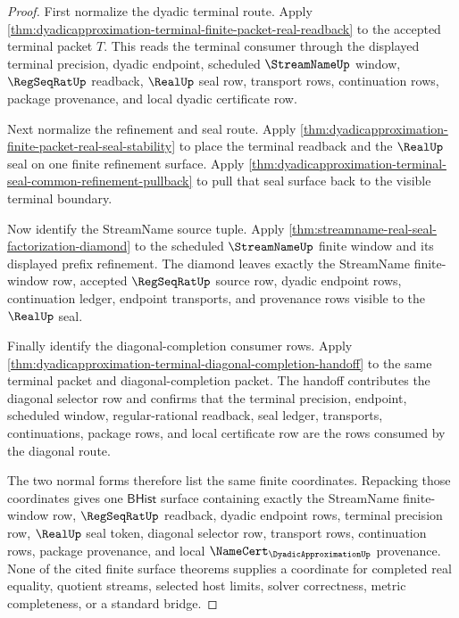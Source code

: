 \begin{proof}
First normalize the dyadic terminal route. Apply
\autoref{thm:dyadicapproximation-terminal-finite-packet-real-readback} to the
accepted terminal packet $T$. This reads the terminal consumer through the
displayed terminal precision, dyadic endpoint, scheduled $\StreamNameUp$
window, $\RegSeqRatUp$ readback, $\RealUp$ seal row, transport rows,
continuation rows, package provenance, and local dyadic certificate row.

Next normalize the refinement and seal route. Apply
\autoref{thm:dyadicapproximation-finite-packet-real-seal-stability} to place
the terminal readback and the $\RealUp$ seal on one finite refinement surface.
Apply
\autoref{thm:dyadicapproximation-terminal-seal-common-refinement-pullback} to
pull that seal surface back to the visible terminal boundary.

Now identify the StreamName source tuple. Apply
\autoref{thm:streamname-real-seal-factorization-diamond} to the scheduled
$\StreamNameUp$ finite window and its displayed prefix refinement. The
diamond leaves exactly the StreamName finite-window row, accepted
$\RegSeqRatUp$ source row, dyadic endpoint rows, continuation ledger,
endpoint transports, and provenance rows visible to the $\RealUp$ seal.

Finally identify the diagonal-completion consumer rows. Apply
\autoref{thm:dyadicapproximation-terminal-diagonal-completion-handoff} to the
same terminal packet and diagonal-completion packet. The handoff contributes
the diagonal selector row and confirms that the terminal precision, endpoint,
scheduled window, regular-rational readback, seal ledger, transports,
continuations, package rows, and local certificate row are the rows consumed by
the diagonal route.

The two normal forms therefore list the same finite coordinates. Repacking
those coordinates gives one $\mathsf{BHist}$ surface containing exactly the
StreamName finite-window row, $\RegSeqRatUp$ readback, dyadic endpoint rows,
terminal precision row, $\RealUp$ seal token, diagonal selector row,
transport rows, continuation rows, package provenance, and local
$\NameCert_{\DyadicApproximationUp}$ provenance. None of the cited finite
surface theorems supplies a coordinate for completed real equality, quotient
streams, selected host limits, solver correctness, metric completeness, or a
standard bridge.
\end{proof}
